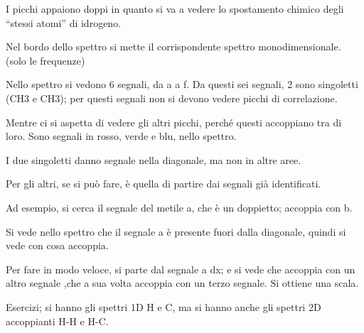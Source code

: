 I picchi appaiono doppi in quanto si va a vedere lo spostamento chimico
degli ``stessi atomi'' di idrogeno.

Nel bordo dello spettro si mette il corrispondente spettro
monodimensionale. (solo le frequenze)

Nello spettro si vedono 6 segnali, da a a f. Da questi sei segnali, 2
sono singoletti (CH3 e CH3); per questi segnali non si devono vedere
picchi di correlazione.

Mentre ci si aspetta di vedere gli altri picchi, perché questi
accoppiano tra di loro. Sono segnali in rosso, verde e blu, nello
spettro.

I due singoletti danno segnale nella diagonale, ma non in altre aree.

Per gli altri, se si può fare, è quella di partire dai segnali già
identificati.

Ad esempio, si cerca il segnale del metile a, che è un doppietto;
accoppia con b.

Si vede nello spettro che il segnale a è presente fuori dalla diagonale,
quindi si vede con cosa accoppia.

Per fare in modo veloce, si parte dal segnale a dx; e si vede che
accoppia con un altro segnale ,che a sua volta accoppia con un terzo
segnale. Si ottiene una scala.

Esercizi; si hanno gli spettri 1D H e C, ma si hanno anche gli
spettri 2D accoppianti H-H e H-C.

\vfill
\pagebreak